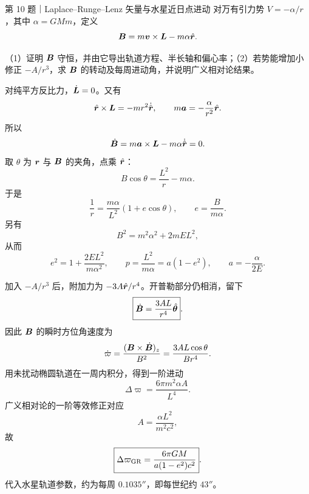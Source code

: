 \begin{problem}{第 10 题｜Laplace--Runge--Lenz 矢量与水星近日点进动}
对万有引力势 $V=-\alpha/r$，其中 $\alpha=GMm$，定义
\[
\bm{B}=m\bm{v}\times\bm{L}-m\alpha\hat{\bm{r}}.
\]

（1）证明 $\bm{B}$ 守恒，并由它导出轨道方程、半长轴和偏心率；（2）若势能增加小修正 $-A/r^3$，求 $\bm{B}$ 的转动及每周进动角，并说明广义相对论结果。
\end{problem}
\begin{solution}
对纯平方反比力，$\dot{\bm{L}}=0$。又有
\[
\hat{\bm{r}}\times\bm{L}=-mr^2\dot{\hat{\bm{r}}},
\qquad
m\bm{a}=-\frac{\alpha}{r^2}\hat{\bm{r}}.
\]
所以
\[
\dot{\bm{B}}=m\bm{a}\times\bm{L}-m\alpha\dot{\hat{\bm{r}}}=0.
\]
取 $\theta$ 为 $\bm{r}$ 与 $\bm{B}$ 的夹角，点乘 $\hat{\bm{r}}$：
\[
B\cos\theta=\frac{L^2}{r}-m\alpha.
\]
于是
\[
\boxed{\frac1r=\frac{m\alpha}{L^2}(1+e\cos\theta)},
\qquad e=\frac{B}{m\alpha}.
\]
另有
\[
B^2=m^2\alpha^2+2mEL^2,
\]
从而
\[
e^2=1+\frac{2EL^2}{m\alpha^2},
\qquad
p=\frac{L^2}{m\alpha}=a(1-e^2),
\qquad
a=-\frac{\alpha}{2E}.
\]

加入 $-A/r^3$ 后，附加力为 $-3A\hat{\bm{r}}/r^4$。开普勒部分仍相消，留下
\[
\boxed{\dot{\bm{B}}=\frac{3AL}{r^4}\hat{\bm{\theta}}}.
\]
因此 $\bm{B}$ 的瞬时方位角速度为
\[
\dot\varpi=\frac{(\bm{B}\times\dot{\bm{B}})_z}{B^2}
=\frac{3AL\cos\theta}{Br^4}.
\]
用未扰动椭圆轨道在一周内积分，得到一阶进动
\[
\boxed{\Delta\varpi=\frac{6\pi m^2\alpha A}{L^4}}.
\]
广义相对论的一阶等效修正对应
\[
A=\frac{\alpha L^2}{m^2c^2},
\]
故
\[
\boxed{\Delta\varpi_{\rm GR}=\frac{6\pi GM}{a(1-e^2)c^2}}.
\]
代入水星轨道参数，约为每周 $0.1035''$，即每世纪约 $43''$。
\end{solution}
